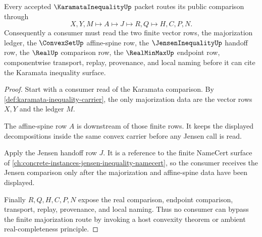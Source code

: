 \begin{theorem}
\label{thm:karamata-inequality-jensen-majorization-handoff}
Every accepted $\KaramataInequalityUp$ packet routes its public comparison through
$$
X,Y,M \longmapsto A \longmapsto J \longmapsto R,Q \longmapsto H,C,P,N .
$$
Consequently a consumer must read the two finite vector rows, the majorization ledger, the $\ConvexSetUp$ affine-spine row, the $\JensenInequalityUp$ handoff row, the $\RealUp$ comparison row, the $\RealMinMaxUp$ endpoint row, componentwise transport, replay, provenance, and local naming before it can cite the Karamata inequality surface.
\end{theorem}
\begin{proof}
Start with a consumer read of the Karamata comparison. By \autoref{def:karamata-inequality-carrier}, the only majorization data are the vector rows $X,Y$ and the ledger $M$.

The affine-spine row $A$ is downstream of those finite rows. It keeps the displayed decompositions inside the same convex carrier before any Jensen call is read.

Apply the Jensen handoff row $J$. It is a reference to the finite NameCert surface of \autoref{ch:concrete-instances-jensen-inequality-namecert}, so the consumer receives the Jensen comparison only after the majorization and affine-spine data have been displayed.

Finally $R,Q,H,C,P,N$ expose the real comparison, endpoint comparison, transport, replay, provenance, and local naming. Thus no consumer can bypass the finite majorization route by invoking a host convexity theorem or ambient real-completeness principle.
\end{proof}



